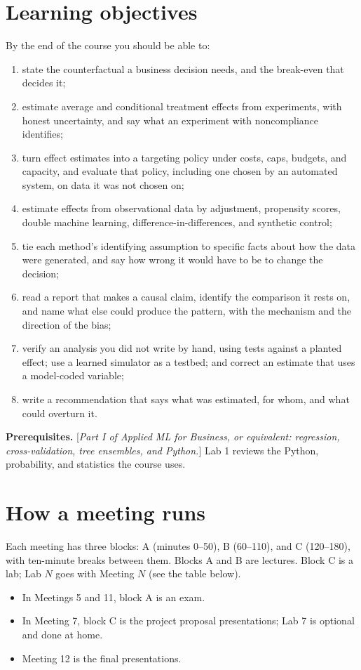 \documentclass[11pt]{article}
\newcommand{\tbd}[1]{\textcolor{warnred}{[\emph{#1}]}}
\begin{document}
\section*{Learning objectives}

By the end of the course you should be able to:
\begin{enumerate}
    \item state the counterfactual a business decision needs, and the break-even that decides it;
    \item estimate average and conditional treatment effects from experiments, with honest uncertainty, and
    say what an experiment with noncompliance identifies;
    \item turn effect estimates into a targeting policy under costs, caps, budgets, and capacity, and
    evaluate that policy, including one chosen by an automated system, on data it was not chosen on;
    \item estimate effects from observational data by adjustment, propensity scores, double machine
    learning, difference-in-differences, and synthetic control;
    \item tie each method's identifying assumption to specific facts about how the data were
    generated, and say how wrong it would have to be to change the decision;
    \item read a report that makes a causal claim, identify the comparison it rests on, and name
    what else could produce the pattern, with the mechanism and the direction of the bias;
    \item verify an analysis you did not write by hand, using tests against a planted effect; use a
    learned simulator as a testbed; and correct an estimate that uses a model-coded variable;
    \item write a recommendation that says what was estimated, for whom, and what could overturn it.
\end{enumerate}

\textbf{Prerequisites.} \tbd{Part I of Applied ML for Business, or equivalent: regression,
cross-validation, tree ensembles, and Python.} Lab 1 reviews the Python, probability, and
statistics the course uses.

\section*{How a meeting runs}

Each meeting has three blocks: A (minutes 0--50), B (60--110), and C (120--180), with ten-minute
breaks between them. Blocks A and B are lectures. Block C is a lab; Lab $N$ goes with Meeting $N$ (see the table below).
\begin{itemize}
    \item In Meetings 5 and 11, block A is an exam.
    \item In Meeting 7, block C is the project proposal presentations; Lab 7 is optional and done at home.
    \item Meeting 12 is the final presentations.
\end{itemize}
\end{document}
